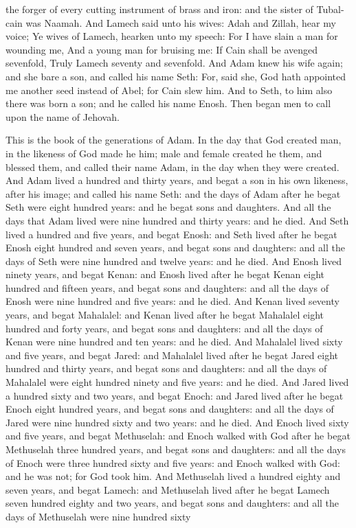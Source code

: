 the forger of every cutting instrument of brass and iron: and the sister of Tubal-cain was Naamah. And Lamech said unto his wives: Adah and Zillah, hear my voice; Ye wives of Lamech, hearken unto my speech: For I have slain a man for wounding me, And a young man for bruising me:  If Cain shall be avenged sevenfold, Truly Lamech seventy and sevenfold.  And Adam knew his wife again; and she bare a son, and called his name Seth: For, said she, God hath appointed me another seed instead of Abel; for Cain slew him. And to Seth, to him also there was born a son; and he called his name Enosh. Then began men to call upon the name of Jehovah. 

This is the book of the generations of Adam. In the day that God created man, in the likeness of God made he him; male and female created he them, and blessed them, and called their name Adam, in the day when they were created. And Adam lived a hundred and thirty years, and begat a son in his own likeness, after his image; and called his name Seth: and the days of Adam after he begat Seth were eight hundred years: and he begat sons and daughters. And all the days that Adam lived were nine hundred and thirty years: and he died.  And Seth lived a hundred and five years, and begat Enosh: and Seth lived after he begat Enosh eight hundred and seven years, and begat sons and daughters: and all the days of Seth were nine hundred and twelve years: and he died.  And Enosh lived ninety years, and begat Kenan: and Enosh lived after he begat Kenan eight hundred and fifteen years, and begat sons and daughters: and all the days of Enosh were nine hundred and five years: and he died.  And Kenan lived seventy years, and begat Mahalalel: and Kenan lived after he begat Mahalalel eight hundred and forty years, and begat sons and daughters: and all the days of Kenan were nine hundred and ten years: and he died.  And Mahalalel lived sixty and five years, and begat Jared: and Mahalalel lived after he begat Jared eight hundred and thirty years, and begat sons and daughters: and all the days of Mahalalel were eight hundred ninety and five years: and he died.  And Jared lived a hundred sixty and two years, and begat Enoch: and Jared lived after he begat Enoch eight hundred years, and begat sons and daughters: and all the days of Jared were nine hundred sixty and two years: and he died.  And Enoch lived sixty and five years, and begat Methuselah: and Enoch walked with God after he begat Methuselah three hundred years, and begat sons and daughters: and all the days of Enoch were three hundred sixty and five years: and Enoch walked with God: and he was not; for God took him.  And Methuselah lived a hundred eighty and seven years, and begat Lamech: and Methuselah lived after he begat Lamech seven hundred eighty and two years, and begat sons and daughters: and all the days of Methuselah were nine hundred sixty 